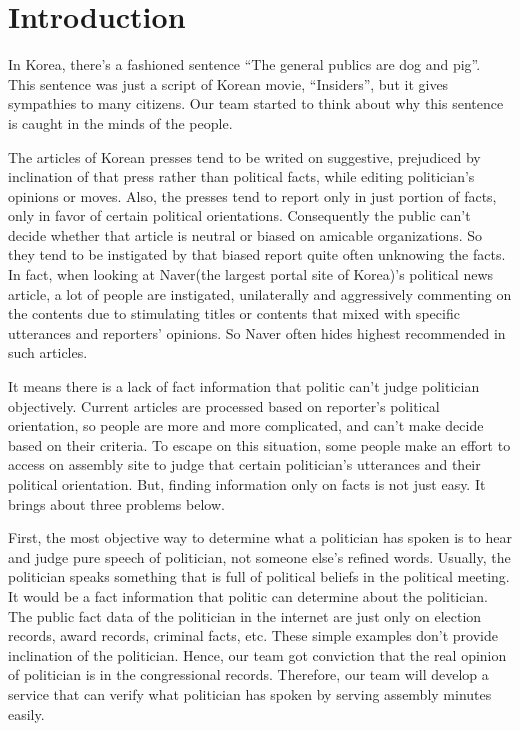\documentclass[conference]{IEEEtran}
\begin{document}
\section{Introduction}
In Korea, there’s a fashioned sentence “The general publics are dog and pig”. This sentence was just a script of Korean movie, “Insiders”, but it gives sympathies to many citizens. Our team started to think about why this sentence is caught in the minds of the people.

The articles of Korean presses tend to be writed on suggestive, prejudiced by inclination of that press rather than political facts, while editing politician’s opinions or moves. Also, the presses tend to report only in just portion of facts, only in favor of certain political orientations. Consequently the public can’t decide whether that article is neutral or biased on amicable organizations. So they tend to be instigated by that biased report quite often unknowing the facts. In fact, when looking at Naver(the largest portal site of Korea)’s political news article, a lot of people are instigated, unilaterally and aggressively commenting on the contents due to stimulating titles or contents that mixed with specific utterances and reporters' opinions. So Naver often hides highest recommended in such articles.

It means there is a lack of fact information that politic can’t judge politician objectively. Current articles are processed based on reporter’s political orientation, so people are more and more complicated, and can’t make decide based on their criteria. To escape on this situation, some people make an effort to access on assembly site to judge that certain politician’s utterances and their political orientation. But, finding information only on facts is not just easy. It brings about three problems below.

First, the most objective way to determine what a politician has spoken is to hear and judge pure speech of politician, not someone else’s refined words. Usually, the politician speaks something that is full of political beliefs in the political meeting. It would be a fact information that politic can determine about the politician. The public fact data of the politician in the internet are just only on election records, award records, criminal facts, etc. These simple examples don’t provide inclination of the politician. Hence, our team got conviction that the real opinion of politician is in the congressional records. Therefore, our team will develop a service that can verify what politician has spoken by serving  assembly minutes easily.
\end{document}
